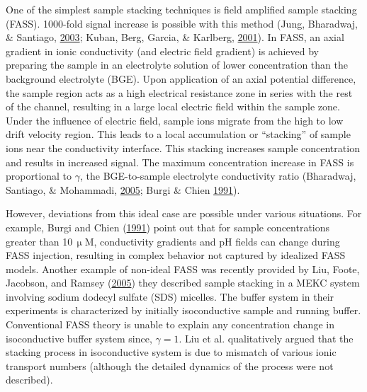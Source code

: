 \documentclass[lineno,authoryear]{FLO_v1}%
\theoremstyle{definition}
\begin{document}
One of the simplest sample stacking techniques is field
amplified sample stacking (FASS). 1000-fold signal increase
is possible with this method (Jung, Bharadwaj, \& Santiago,
\hyperlink{bib13}{2003}; Kuban, Berg, Garcia, \& Karlberg,
\hyperlink{bib16}{2001}). In FASS, an axial gradient in
ionic conductivity (and electric field gradient) is
achieved by preparing the sample in an electrolyte solution
of lower concentration than the background electrolyte
(BGE). Upon application of an axial potential difference,
the sample region acts as a high electrical resistance zone
in series with the rest of the channel, resulting in a
large local electric field within the sample zone. Under
the influence of electric field, sample ions migrate from
the high to low drift velocity region. This leads to a
local accumulation or ``stacking'' of sample ions near the
conductivity interface. This stacking increases sample
concentration and results in increased signal. The maximum
concentration increase in FASS is proportional to $\gamma$,
the BGE-to-sample electrolyte conductivity ratio
(Bharadwaj, Santiago, \& Mohammadi, \hyperlink{bib1}{2005};
Burgi \& Chien \hyperlink{bib4}{1991}).

However, deviations from this ideal case are possible under
various situations. For example, Burgi and Chien
(\hyperlink{bib4}{1991}) point out that for sample
concentrations greater than 10\,$\upmu$M, conductivity
gradients and pH fields can change during FASS injection,
resulting in complex behavior not captured by idealized
FASS models. Another example of non-ideal FASS was recently
provided by Liu, Foote, Jacobson, and Ramsey
(\hyperlink{bib18}{2005})  they described sample stacking
in a MEKC system involving sodium dodecyl sulfate (SDS)
micelles. The buffer system in their experiments is
characterized by initially isoconductive sample and running
buffer. Conventional FASS theory is unable to explain any
concentration change in isoconductive buffer system since,
$\gamma =1$. Liu et al. qualitatively argued that the
stacking process in isoconductive system is due to mismatch
of various ionic transport numbers (although the detailed
dynamics of the process were not described).
\end{document}
